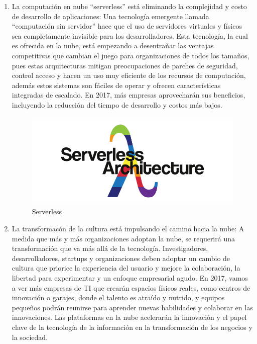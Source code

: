 \documentclass[a4paper, 12pt]{report}
\begin{document}
\begin{justify}
\begin{enumerate}[label=\alph*)]
    \item{La computaci\'on en nube “serverless” est\'a eliminando la complejidad y costo de desarrollo de aplicaciones:} Una tecnolog\'ia emergente llamada “computaci\'on sin servidor” hace que el uso de servidores virtuales y f\'isicos sea completamente invisible para los desarrolladores. Esta tecnolog\'ia, la cual es ofrecida en la nube, est\'a empezando a desentra\~nar las ventajas competitivas que cambian el juego para organizaciones de todos los tama\~nos, pues estas arquitecturas mitigan preocupaciones de parches de seguridad, control acceso y hacen un uso muy eficiente de los recursos de computaci\'on, adem\'as estos sistemas son f\'aciles de operar y ofrecen caracter\'isticas integradas de escalado. En 2017, m\'as empresas aprovechar\'an sus beneficios, incluyendo la reducci\'on del tiempo de desarrollo y costos m\'as bajos.
		
		\begin{figure}[ht]
	\begin{center}
		\includegraphics[width=.8\textwidth]{serverless}
		\caption{Serverless}
		\label{fig:serverless}
	\end{center}
\end{figure}

		\item{La transformac\'on de la cultura est\'a impulsando el camino hacia la nube:} A medida que m\'as y m\'as organizaciones adoptan la nube, se requerir\'a una transformaci\'on que va m\'as all\'a de la tecnolog\'ia. Investigadores, desarrolladores, startups y organizaciones deben adoptar un cambio de cultura que priorice la experiencia del usuario y mejore la colaboraci\'on, la libertad para experimentar y un enfoque empresarial agudo. En 2017, vamos a ver m\'as empresas de TI que crear\'an espacios f\'isicos reales, como centros de innovaci\'on o garajes, donde el talento es atra\'ido y nutrido, y equipos pequeños podr\'an reunirse para aprender nuevas habilidades y colaborar en las innovaciones. Las plataformas en la nube acelerar\'an la innovaci\'on y el papel clave de la tecnolog\'ia de la informaci\'on en la transformaci\'on de los negocios y la sociedad.
		

\end{enumerate}
\end{justify}
\end{document}
